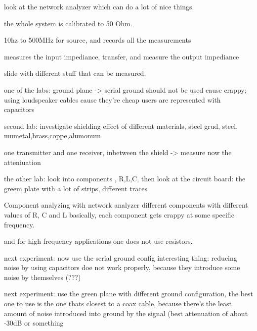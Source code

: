 



look at the network analyzer which can do a lot of nice things.

the whole system is calibrated to 50 Ohm.

10hz to 500MHz for source, and records all the measurements

measures the input impediance, transfer, and measure the output impediance

slide with different stuff that can be measured.

one of the labs:
ground plane -> serial ground should not be used cause crappy; using loudspeaker cables cause they're cheap
users are represented with capacitors

second lab:
investigate shielding effect of different materials, steel grud, steel, mumetal,brass,coppe,alumonum

one transmitter and one receiver, inbetween the shield -> measure now the atteniuation

the other lab:
look into components , R,L,C, then look at the circuit board:
the greem plate with a lot of strips, different traces



Component analyzing with network analyzer
different components with different values of R, C and L
basically, each component gets crappy at some specific frequency.

and for high frequency applications one does not use resistors.



next experiment:
now use the serial ground config
interesting thing: reducing noise by using capacitors doe not work properly, because they introduce some noise by themselves (???)

next experiment:
use the green plane with different ground configuration, the best one to use is the one thats closest to a coax cable, because there's the least amount of noise introduced into ground by the signal (best attenuation of about -30dB or something



